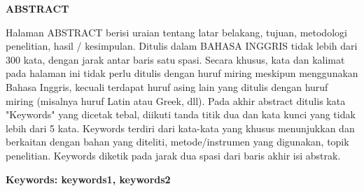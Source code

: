 \clearpage
{}%
\thispagestyle{fancy}

\begin{center}
	\large \bfseries \MakeUppercase{Abstract}\\
	\bigskip

	\normalsize \normalfont \justifying \singlespacing
	Halaman ABSTRACT berisi uraian tentang latar belakang, tujuan, metodologi penelitian, hasil / kesimpulan. Ditulis dalam BAHASA INGGRIS tidak lebih dari 300 kata, dengan jarak antar baris satu spasi. Secara khusus, kata dan kalimat pada halaman ini tidak perlu ditulis dengan huruf miring meskipun menggunakan Bahasa Inggris, kecuali terdapat huruf asing lain yang ditulis dengan huruf miring (misalnya huruf Latin atau Greek, dll). Pada akhir abstract ditulis kata "Keywords" yang dicetak tebal, diikuti tanda titik dua dan kata kunci yang tidak lebih dari 5 kata. Keywords terdiri dari kata-kata yang khusus menunjukkan dan berkaitan dengan bahan yang diteliti, metode/instrumen yang digunakan, topik penelitian. Keywords diketik pada jarak dua spasi dari baris akhir isi abstrak.\par

    \vspace{20pt}
	\raggedright\textbf{Keywords: keywords1, keywords2}

	\vfill

\end{center}
\clearpage
